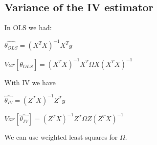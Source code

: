 \subsection{Variance of the IV estimator}

In OLS we had:

\(\hat {\theta_{OLS}} = (X^TX)^{-1}X^Ty\)

\(Var [\hat {\theta_{OLS}}]=(X^TX)^{-1}X^T\Omega X(X^TX)^{-1}\)

With IV we have

\(\hat {\theta_{IV}} = (Z^TX)^{-1}Z^Ty\)

\(Var [\hat {\theta_{IV}}]=(Z^TX)^{-1}Z^T\Omega Z(Z^TX)^{-1}\)

We can use weighted least squares for \(\Omega \).


